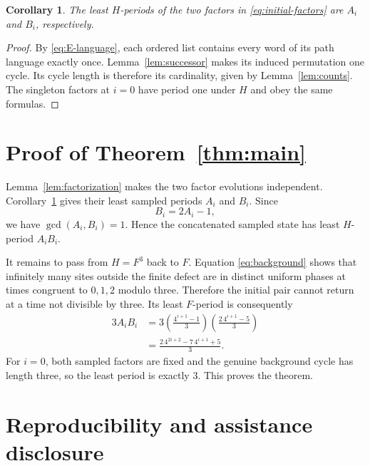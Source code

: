 \documentclass[11pt]{article}
\newtheorem{corollary}[theorem]{Corollary}
\theoremstyle{remark}
\begin{document}
\begin{corollary}\label{cor:factorperiods}
The least $H$-periods of the two factors in \eqref{eq:initial-factors} are
$A_i$ and $B_i$, respectively.
\end{corollary}

\begin{proof}
By \eqref{eq:E-language}, each ordered list contains every word of its path
language exactly once.  Lemma~\ref{lem:successor} makes its induced permutation
one cycle.  Its cycle length is therefore its cardinality, given by
Lemma~\ref{lem:counts}.  The singleton factors at $i=0$ have period one under
$H$ and obey the same formulas.
\end{proof}

\section{Proof of Theorem~\ref{thm:main}}

Lemma~\ref{lem:factorization} makes the two factor evolutions independent.
Corollary~\ref{cor:factorperiods} gives their least sampled periods $A_i$ and
$B_i$.  Since
\begin{equation}\label{eq:coprime}
 B_i=2A_i-1,
\end{equation}
we have $\gcd(A_i,B_i)=1$.  Hence the concatenated sampled state has least
$H$-period $A_iB_i$.

It remains to pass from $H=F^3$ back to $F$.  Equation
\eqref{eq:background} shows that infinitely many sites outside the finite
defect are in distinct uniform phases at times congruent to $0,1,2$ modulo
three.  Therefore the initial pair cannot return at a time not divisible by
three.  Its least $F$-period is consequently
\begin{align*}
3A_iB_i
&=3\left(\frac{4^{i+1}-1}{3}\right)
       \left(\frac{2\,4^{i+1}-5}{3}\right)\\
&=\frac{2\,4^{2i+2}-7\,4^{i+1}+5}{3}.
\end{align*}
For $i=0$, both sampled factors are fixed and the genuine background cycle
has length three, so the least period is exactly $3$.  This proves the theorem.

\section{Reproducibility and assistance disclosure}
\end{document}
